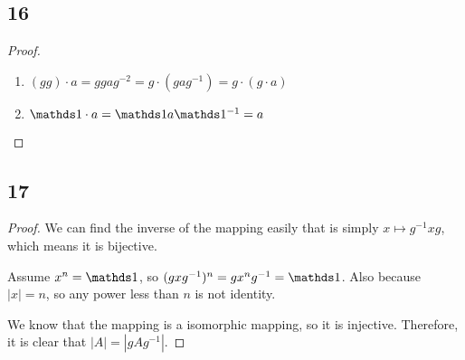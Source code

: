 \subsection*{16}

\begin{proof}
	\begin{enumerate}
		\item $(gg) \cdot a = ggag^{-2} = g \cdot (gag^{-1}) = g \cdot (g \cdot a)$
		\item $\one \cdot a = \one a \one^{-1} = a$
	\end{enumerate}
\end{proof}


\subsection*{17}

\begin{proof}
	We can find the inverse of the mapping easily that is simply $x \mapsto g^{-1}xg$, which means it is bijective.

	Assume $x^n=\one$, so $(gxg^{-1})^n = gx^ng^{-1} = \one$.
	Also because $|x|=n$, so any power less than $n$ is not identity.

	We know that the mapping is a isomorphic mapping, so it is injective.
	Therefore, it is clear that $|A|=|gAg^{-1}|$.
	
\end{proof}









